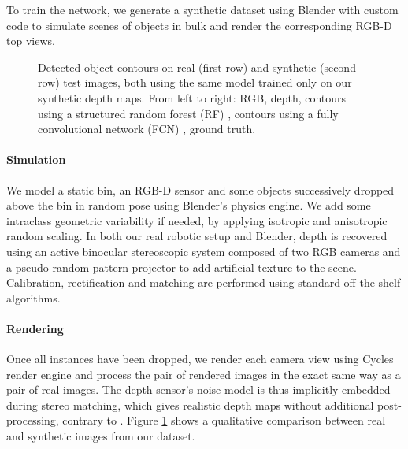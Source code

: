 \documentclass[runningheads,a4paper]{llncs}
\newlength\mywidth
\begin{document}
To train the network, we generate a synthetic dataset using Blender \cite{Blender} with custom code to simulate scenes of objects in bulk and render the corresponding RGB-D top views.

\begin{figure}[h]
\centering
\setlength{\mywidth}{.17\linewidth}



\caption{Detected object contours on real (first row) and synthetic (second row) test images, both using the same model trained only on our synthetic depth maps. From left to right: RGB, depth, contours using a structured random forest (RF) \cite{DollarZ14}, contours using a fully convolutional network (FCN) \cite{Yang2016CEDN}, ground truth.}
\label{fig:edgedetection}
\end{figure}

\paragraph{Simulation}

We model a static bin, an RGB-D sensor and some objects successively dropped above the bin in random pose using Blender's physics engine. We add some intraclass geometric variability if needed, by applying isotropic and anisotropic random scaling. In both our real robotic setup and Blender, depth is recovered using an active binocular stereoscopic system composed of two RGB cameras and a pseudo-random pattern projector to add artificial texture to the scene. Calibration, rectification and matching are performed using standard off-the-shelf algorithms.

\paragraph{Rendering}

Once all instances have been dropped, we render each camera view using Cycles render engine and process the pair of rendered images in the exact same way as a pair of real images. The depth sensor's noise model is thus implicitly embedded during stereo matching, which gives realistic depth maps without additional post-processing, contrary to \cite{Handa_2016_CVPR}. Figure \ref{fig:edgedetection} shows a qualitative comparison between real and synthetic images from our dataset.
\end{document}
